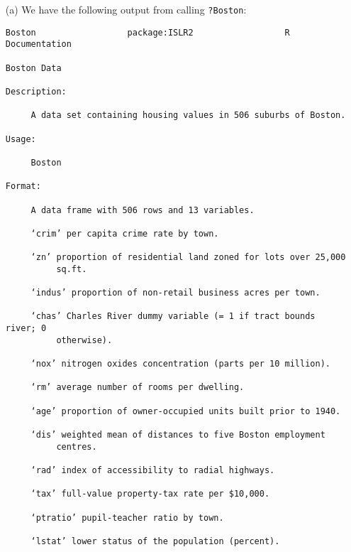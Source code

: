 
\begin{itemize}
    \item[(a)] We have the following output from calling \verb|?Boston|:
    \scriptsize\begin{verbatim}
Boston                  package:ISLR2                  R Documentation

Boston Data

Description:

     A data set containing housing values in 506 suburbs of Boston.

Usage:

     Boston

Format:

     A data frame with 506 rows and 13 variables.

     ‘crim’ per capita crime rate by town.

     ‘zn’ proportion of residential land zoned for lots over 25,000
          sq.ft.

     ‘indus’ proportion of non-retail business acres per town.

     ‘chas’ Charles River dummy variable (= 1 if tract bounds river; 0
          otherwise).

     ‘nox’ nitrogen oxides concentration (parts per 10 million).

     ‘rm’ average number of rooms per dwelling.

     ‘age’ proportion of owner-occupied units built prior to 1940.

     ‘dis’ weighted mean of distances to five Boston employment
          centres.

     ‘rad’ index of accessibility to radial highways.

     ‘tax’ full-value property-tax rate per $10,000.

     ‘ptratio’ pupil-teacher ratio by town.

     ‘lstat’ lower status of the population (percent).


\end{verbatim}
\end{itemize}

